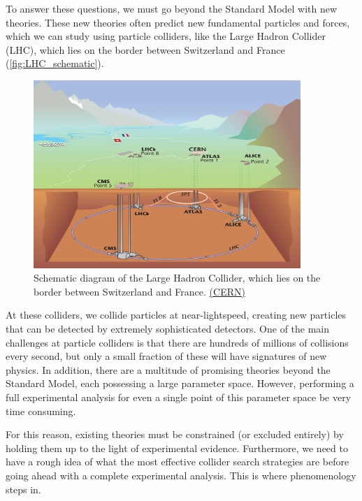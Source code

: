 To answer these questions, we must go beyond the Standard Model with new theories. These new theories often predict new fundamental particles and forces, which we can study using particle colliders, like the Large Hadron Collider (LHC), which lies on the border between Switzerland and France (\autoref{fig:LHC_schematic}).

\begin{figure}
  \centering
  \includegraphics[width=0.9\textwidth]{images/LHC}
  \caption{Schematic diagram of the Large Hadron Collider, which lies on the border between Switzerland and France. \href{http://cds.cern.ch/journal/CERNBulletin/2008/38/News\%20Articles/1125888?ln=en}{(CERN)}}
  \label{fig:LHC_schematic}
\end{figure}

At these colliders, we collide particles at near-lightspeed, creating new particles that can be detected by extremely sophisticated detectors. One of the main challenges at particle colliders is that there are hundreds of millions of collisions every second, but only a small fraction of these will have signatures of new physics. In addition, there are a multitude of promising theories beyond the Standard Model, each possessing a large parameter space. However, performing a full experimental analysis for even a single point of this parameter space be very time consuming.

For this reason, existing theories must be constrained (or excluded entirely) by holding them up to the light of experimental evidence. Furthermore, we need to have a rough idea of what the most effective collider search strategies are before going ahead with a complete experimental analysis. This is where phenomenology steps in.

